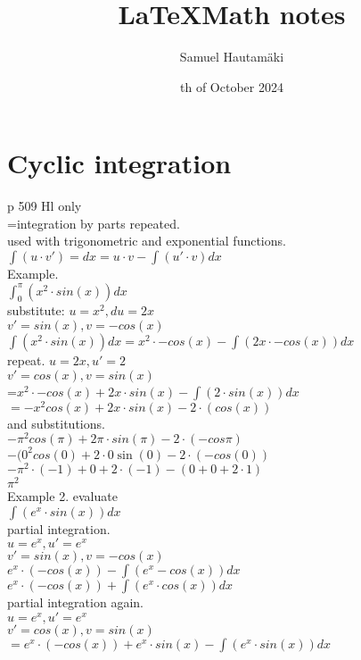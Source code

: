\documentclass{article}
\title{\LaTeX Math notes}
\author{Samuel Hautamäki}
\date{th of October 2024}
\begin{document}
  \maketitle
   
  \section{Cyclic integration}
  p 509 Hl only\\
  =integration by parts repeated.\\
  used with trigonometric and exponential functions.\\
  $\int (u\cdot v')=dx =u\cdot v-\int (u'\cdot v)dx$\\

  Example.\\
  $\int_{0}^{\pi}(x^2\cdot sin(x))dx$\\
  substitute: $u=x^2, du=2x$\\
  $v'=sin(x), v=-cos(x)$\\
  $\int (x^2\cdot sin(x))dx=x^2\cdot -cos(x)-\int(2x\cdot -cos(x))dx$\\
  repeat. $u=2x,u'=2$\\
  $v'=cos(x), v=sin(x)$\\
  =$x^2\cdot -cos(x)+2x\cdot sin(x)-\int (2\cdot sin(x))dx$\\
  $=-x^2cos(x)+2x\cdot sin(x)-2\cdot (cos(x))$\\
  and substitutions.\\
  $-\pi^2 cos(\pi)+2\pi\cdot sin(\pi)-2\cdot (-cos\pi)$\\
  $-(0^2cos(0)+2\cdot0\sin (0)-2\cdot (-cos(0))$\\
  $-\pi^2\cdot (-1)+0+2\cdot(-1)-(0+0+2\cdot1)$\\
  $\pi^2$\\
  Example 2. evaluate \\
  $\int (e^x\cdot sin(x))dx$\\
  partial integration.\\
  $u=e^x, u'=e^x$\\
  $v'=sin(x), v=-cos(x)$\\
  $e^x\cdot (-cos(x))-\int(e^x-cos(x))dx$\\
  $e^x\cdot(-cos(x)) + \int(e^x\cdot cos(x))dx$\\
  partial integration again.\\
  $u=e^x, u'=e^x$\\
  $v'=cos(x), v=sin(x)$\\
  $=e^x\cdot (-cos(x))+ e^x\cdot sin(x)-\int(e^x\cdot sin(x))dx$\\
\end{document}
